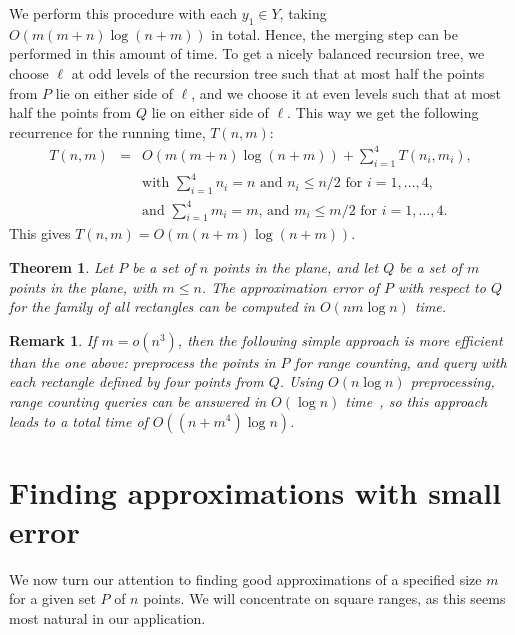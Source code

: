 \documentclass{elsart}
\newtheorem{theorem}[definition]{Theorem}
\newtheorem{remark}[definition]{Remark}
\begin{document}
We perform this procedure with each $y_1\in Y$, taking $O(m(m+n)\log
(n+m))$ in total. Hence, the merging step can be performed in this
amount of time.  To get a nicely balanced recursion tree, we choose
$\ell$ at odd levels of the recursion tree such that at most half the
points from $P$ lie on either side of $\ell$, and we choose it at even
levels such that at most half the points from $Q$ lie on either side
of $\ell$.
This way we get the following recurrence for the running
time, $T(n,m)$:
\[
\begin{array}{lll}
T(n,m) & = &  O(m(m+n)\log (n+m)) + \sum_{i=1}^{4} T(n_i,m_i), \\[2mm]
 & & \mbox{with $\sum_{i=1}^{4} n_i = n$ and $n_i \leq n/2$ for $i=1,\ldots,4$,} \\[2mm]
 & & \mbox{and $\sum_{i=1}^{4} m_i = m$, and $m_i \leq m/2$ for $i=1,\ldots,4$.}
\end{array}
\]
This gives $T(n,m) = O(m(n+m)\log (n+m))$.
\begin{theorem}\label{th:rectangles}
Let $P$ be a set of $n$ points in the plane, and let $Q$
be a set of $m$ points in the plane, with $m \leq n$.
The approximation error of $P$ with respect to $Q$
for the family of all rectangles can be computed in
$O(nm\log n)$ time.
\end{theorem}
\begin{remark}
If $m=o(n^3)$, then the following simple approach is more efficient
than the one above: preprocess the points in $P$ for range counting,
and query with each rectangle defined by four points from $Q$.
Using $O(n\log n)$ preprocessing, range counting queries can be
answered in $O(\log n)$ time~\cite{a-rs-97}, so this approach
leads to a total time of $O((n+m^4)\log n)$.
\end{remark}

\section{Finding approximations with small error}
\label{se:experiments}

We now turn our attention to finding good approximations of a
specified size $m$ for a given set $P$ of $n$ points.  We will
concentrate on square ranges, as this seems most natural in our
application.
\end{document}
